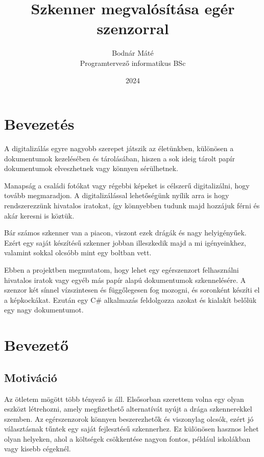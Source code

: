 \documentclass[]{thesis-ekf}
\theoremstyle{definition}
\theoremstyle{remark}
\begin{document}
\title{Szkenner megvalósítása egér szenzorral}
\author{Bodnár Máté\\Programtervező informatikus BSc}
\date{2024}
\maketitle

\tableofcontents

\chapter*{Bevezetés}
A digitalizálás egyre nagyobb szerepet játszik az életünkben, különösen a dokumentumok kezelésében és tárolásában, hiszen a sok ideig tárolt papír dokumentumok elveszhetnek vagy könnyen sérülhetnek.

Manapság a családi fotókat vagy régebbi képeket is célszerű digitalizálni, hogy tovább megmaradjon. A digitalizálással lehetőségünk nyílik arra is hogy rendszerezzünk hivatalos iratokat, így könnyebben tudunk majd hozzájuk férni és akár keresni is köztük. 

Bár számos szkenner van a piacon, viszont ezek drágák és nagy helyigényűek. Ezért egy saját készítésű szkenner jobban illeszkedik majd a mi igényeinkhez, valamint sokkal olcsóbb mint egy boltban vett. 

Ebben a projektben megmutatom, hogy lehet egy egérszenzort felhasználni hivatalos iratok vagy egyéb más papír alapú dokumentumok szkennelésére. A szenzor két sínnel vízszintesen és függőlegesen fog mozogni, és soronként készíti el a képkockákat. Ezután egy C\# alkalmazás feldolgozza azokat és kialakít belőlük egy nagy dokumentumot.

\chapter{Bevezető}

\section{Motiváció}
Az ötletem mögött több tényező is áll. Elsősorban szerettem volna egy olyan eszközt létrehozni, amely megfizethető alternatívát nyújt a drága szkennerekkel szemben. Az egérszenzorok könnyen beszerezhetők és viszonylag olcsók, ezért jó választásnak tűntek egy saját fejlesztésű szkennerhez. Ez különösen hasznos lehet olyan helyeken, ahol a költségek csökkentése nagyon fontos, például iskolákban vagy kisebb cégeknél.
\end{document}
